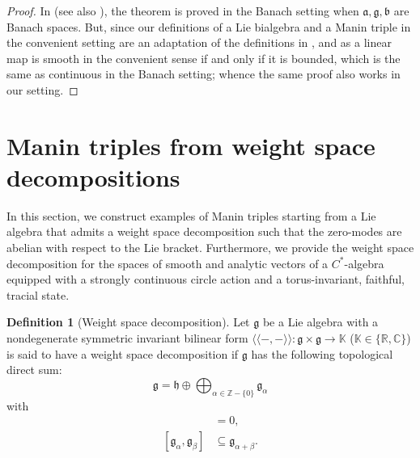 \documentclass[11pt,reqno]{amsart}
\theoremstyle{definition}
\newtheorem{definition}[theorem]{Definition}
\numberwithin{equation}{section}
\begin{document}
\begin{proof}
In \cite[Theorem 4.9]{32} (see also \cite[Theorem 2.3]{32} ), the theorem is proved in the Banach setting when $\mathfrak{a}, \mathfrak{g}, \mathfrak{b}$ are Banach spaces. But, since our definitions of a Lie bialgebra and a Manin triple in the convenient setting are an adaptation of the definitions in \cite{32}, and as a linear map is smooth in the convenient sense if and only if it is bounded, which is the same as continuous in the Banach setting; whence the same proof also works in our setting.
\end{proof}
\section{Manin triples from weight space decompositions}\label{5}

In this section, we construct examples of Manin triples starting from a Lie algebra that admits a weight space decomposition such that the zero-modes are abelian with respect to the Lie bracket. Furthermore, we provide the weight space decomposition for the spaces of smooth and analytic vectors of a $C^*$-algebra equipped with a strongly continuous circle action and a torus-invariant, faithful, tracial state.
\begin{definition}[Weight space decomposition]\label{Weight space decomposition}
Let $\mathfrak{g}$ be a Lie algebra with a nondegenerate symmetric invariant bilinear form $\langle\langle -, - \rangle\rangle : \mathfrak{g} \times \mathfrak{g} \rightarrow \mathbb{K}$ ($\mathbb K\in \{\mathbb R, \mathbb C\}$) is said to have a weight space decomposition if $\mathfrak{g}$ has the following topological direct sum:
\[
\mathfrak{g} = \mathfrak{h} \oplus \bigoplus_{\alpha \in \mathbb{Z} - \{0\}} \mathfrak{g}_{\alpha}
\]
with
\begin{align*}
[\mathfrak{h}, \mathfrak{h}] &= 0, \\
[\mathfrak{g}_{\alpha}, \mathfrak{g}_{\beta}] &\subseteq \mathfrak{g}_{\alpha+\beta}.
\end{align*}
\end{definition}
\end{document}
